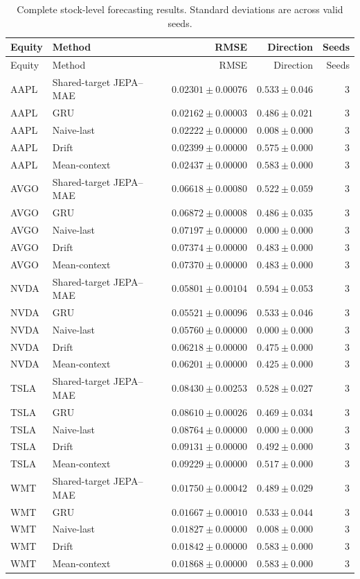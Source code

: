 \begin{longtable}{llrrr}
\caption{Complete stock-level forecasting results. Standard deviations are across valid seeds.}\label{tab:appendix_stock_metrics}\\
\toprule
Equity & Method & RMSE & Direction & Seeds \\
\midrule
\endfirsthead
\toprule
Equity & Method & RMSE & Direction & Seeds \\
\midrule
\endhead
AAPL & Shared-target JEPA--MAE & $0.02301 \pm 0.00076$ & $0.533 \pm 0.046$ & 3 \\
AAPL & GRU & $0.02162 \pm 0.00003$ & $0.486 \pm 0.021$ & 3 \\
AAPL & Naive-last & $0.02222 \pm 0.00000$ & $0.008 \pm 0.000$ & 3 \\
AAPL & Drift & $0.02399 \pm 0.00000$ & $0.575 \pm 0.000$ & 3 \\
AAPL & Mean-context & $0.02437 \pm 0.00000$ & $0.583 \pm 0.000$ & 3 \\
AVGO & Shared-target JEPA--MAE & $0.06618 \pm 0.00080$ & $0.522 \pm 0.059$ & 3 \\
AVGO & GRU & $0.06872 \pm 0.00008$ & $0.486 \pm 0.035$ & 3 \\
AVGO & Naive-last & $0.07197 \pm 0.00000$ & $0.000 \pm 0.000$ & 3 \\
AVGO & Drift & $0.07374 \pm 0.00000$ & $0.483 \pm 0.000$ & 3 \\
AVGO & Mean-context & $0.07370 \pm 0.00000$ & $0.483 \pm 0.000$ & 3 \\
NVDA & Shared-target JEPA--MAE & $0.05801 \pm 0.00104$ & $0.594 \pm 0.053$ & 3 \\
NVDA & GRU & $0.05521 \pm 0.00096$ & $0.533 \pm 0.046$ & 3 \\
NVDA & Naive-last & $0.05760 \pm 0.00000$ & $0.000 \pm 0.000$ & 3 \\
NVDA & Drift & $0.06218 \pm 0.00000$ & $0.475 \pm 0.000$ & 3 \\
NVDA & Mean-context & $0.06201 \pm 0.00000$ & $0.425 \pm 0.000$ & 3 \\
TSLA & Shared-target JEPA--MAE & $0.08430 \pm 0.00253$ & $0.528 \pm 0.027$ & 3 \\
TSLA & GRU & $0.08610 \pm 0.00026$ & $0.469 \pm 0.034$ & 3 \\
TSLA & Naive-last & $0.08764 \pm 0.00000$ & $0.000 \pm 0.000$ & 3 \\
TSLA & Drift & $0.09131 \pm 0.00000$ & $0.492 \pm 0.000$ & 3 \\
TSLA & Mean-context & $0.09229 \pm 0.00000$ & $0.517 \pm 0.000$ & 3 \\
WMT & Shared-target JEPA--MAE & $0.01750 \pm 0.00042$ & $0.489 \pm 0.029$ & 3 \\
WMT & GRU & $0.01667 \pm 0.00010$ & $0.533 \pm 0.044$ & 3 \\
WMT & Naive-last & $0.01827 \pm 0.00000$ & $0.008 \pm 0.000$ & 3 \\
WMT & Drift & $0.01842 \pm 0.00000$ & $0.583 \pm 0.000$ & 3 \\
WMT & Mean-context & $0.01868 \pm 0.00000$ & $0.583 \pm 0.000$ & 3 \\
\bottomrule
\end{longtable}
